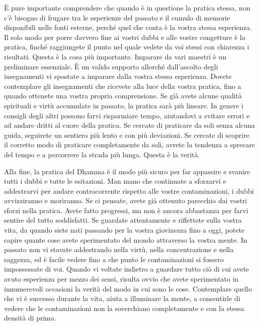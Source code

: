 È pure importante comprendere che quando è in questione la pratica
stessa, non c'è bisogno di frugare tra le esperienze del passato e il
cumulo di memorie disponibili nelle fonti esterne, perché quel che conta
è la vostra stessa esperienza. Il solo modo per porre davvero fine ai
vostri dubbi e alle vostre congetture è la pratica, finché raggiungete
il punto nel quale vedete da voi stessi con chiarezza i risultati.
Questa è la cosa più importante. Imparare da vari maestri è un
preliminare essenziale. È un valido supporto allorché dall'ascolto degli
insegnamenti vi spostate a imparare dalla vostra stessa esperienza.
Dovete contemplare gli insegnamenti che ricevete alla luce della vostra
pratica, fino a quando ottenete una vostra propria comprensione. Se già
avete alcune qualità spirituali e virtù accumulate in passato, la
pratica sarà più lineare. In genere i consigli degli altri possono farvi
risparmiare tempo, aiutandovi a evitare errori e ad andare dritti al
cuore della pratica. Se cercate di praticare da soli senza alcuna guida,
seguirete un sentiero più lento e con più deviazioni. Se cercate di
scoprire il corretto modo di praticare completamente da soli, avrete la
tendenza a sprecare del tempo e a percorrere la strada più lunga. Questa
è la verità.

Alla fine, la pratica del Dhamma è il modo più sicuro per far appassire
e svanire tutti i dubbi e tutte le esitazioni. Man mano che continuate a
sforzarvi e addestrarvi per andare controcorrente rispetto alle vostre
contaminazioni, i dubbi avvizziranno e moriranno. Se ci pensate, avete
già ottenuto parecchio dai vostri sforzi nella pratica. Avete fatto
progressi, ma non è ancora abbastanza per farvi sentire del tutto
soddisfatti. Se guardate attentamente e riflettete sulla vostra vita, da
quando siete nati passando per la vostra giovinezza fino a oggi, potete
capire quante cose avete sperimentato del mondo attraverso la vostra
mente. In passato non vi stavate addestrando nella virtù, nella
concentrazione e nella saggezza, ed è facile vedere fino a che punto le
contaminazioni si fossero impossessate di voi. Quando vi voltate
indietro a guardare tutto ciò di cui avete avuto esperienza per mezzo
dei sensi, risulta ovvio che avete sperimentato in innumerevoli
occasioni la verità del modo in cui sono le cose. Contemplare quello che
vi è successo durante la vita, aiuta a illuminare la mente, a
consentirle di vedere che le contaminazioni non la soverchiano
completamente e con la stessa densità di prima.

